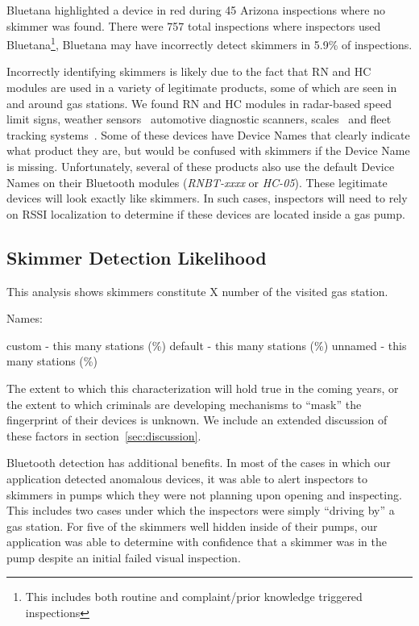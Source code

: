 Bluetana highlighted a device in red during 45 Arizona inspections where no
skimmer was found.
%
There were 757 total inspections where inspectors used
Bluetana\footnote{This includes both routine and complaint/prior knowledge
triggered inspections},  Bluetana may have incorrectly detect skimmers in 5.9\%
of inspections.


Incorrectly identifying skimmers is likely due to the fact that  RN and HC
modules are used in a variety of legitimate products, some of which are seen in
and around gas stations.
%
We found RN and HC modules in radar-based speed limit signs, weather
sensors~\cite{rnbtweathersensor} automotive diagnostic scanners,
scales~\cite{rnbtscale} and fleet tracking systems~\cite{rnbteletrac}.
%
Some of these devices have Device Names that clearly indicate what product they
are, but would be confused with skimmers if the Device Name
is missing.
%
Unfortunately, several of these products also use the default Device Names on
their Bluetooth modules (\emph{RNBT-xxxx} or \emph{HC-05}).
%
These legitimate devices will look exactly like skimmers.
%
In such cases, inspectors will need to rely on RSSI localization to determine if these devices
are located inside a gas pump.

\subsection{Skimmer Detection Likelihood}
This analysis shows skimmers constitute X number of the visited gas station.

Names:

custom - this many stations (\%)
default - this many stations (\%)
unnamed - this many stations (\%)

The extent to which this characterization will hold true in the coming years, or the extent to which criminals are
developing mechanisms to ``mask'' the fingerprint of their devices is unknown.
%
We include an extended discussion of these factors in section~\ref{sec:discussion}.

Bluetooth detection has additional benefits.
%
In most of the cases in which our application detected anomalous devices, it was able to alert inspectors to skimmers
in pumps which they were not planning upon opening and inspecting.
%
This includes two cases under which the inspectors were simply ``driving by'' a gas station.
%
For five of the skimmers well hidden inside of their pumps, our application was able to determine with confidence
that a skimmer was in the pump despite an initial failed visual inspection.



